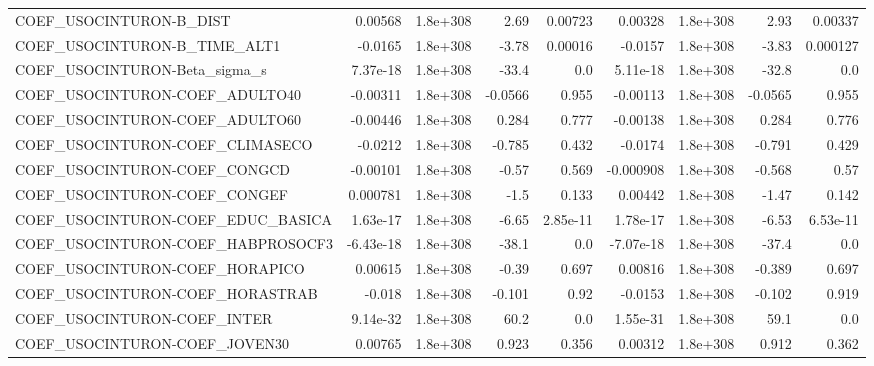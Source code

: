 \begin{tabular}{lrrrrrrrr}
COEF\_USOCINTURON-B\_DIST           &     0.00568 &     1.8e+308 &      2.69 &  0.00723 &    0.00328 &    1.8e+308 &         2.93 &       0.00337 \\
COEF\_USOCINTURON-B\_TIME\_ALT1      &     -0.0165 &     1.8e+308 &     -3.78 &  0.00016 &    -0.0157 &    1.8e+308 &        -3.83 &      0.000127 \\
COEF\_USOCINTURON-Beta\_sigma\_s     &    7.37e-18 &     1.8e+308 &     -33.4 &      0.0 &   5.11e-18 &    1.8e+308 &        -32.8 &           0.0 \\
COEF\_USOCINTURON-COEF\_ADULTO40    &    -0.00311 &     1.8e+308 &   -0.0566 &    0.955 &   -0.00113 &    1.8e+308 &      -0.0565 &         0.955 \\
COEF\_USOCINTURON-COEF\_ADULTO60    &    -0.00446 &     1.8e+308 &     0.284 &    0.777 &   -0.00138 &    1.8e+308 &        0.284 &         0.776 \\
COEF\_USOCINTURON-COEF\_CLIMASECO   &     -0.0212 &     1.8e+308 &    -0.785 &    0.432 &    -0.0174 &    1.8e+308 &       -0.791 &         0.429 \\
COEF\_USOCINTURON-COEF\_CONGCD      &    -0.00101 &     1.8e+308 &     -0.57 &    0.569 &  -0.000908 &    1.8e+308 &       -0.568 &          0.57 \\
COEF\_USOCINTURON-COEF\_CONGEF      &    0.000781 &     1.8e+308 &      -1.5 &    0.133 &    0.00442 &    1.8e+308 &        -1.47 &         0.142 \\
COEF\_USOCINTURON-COEF\_EDUC\_BASICA &    1.63e-17 &     1.8e+308 &     -6.65 & 2.85e-11 &   1.78e-17 &    1.8e+308 &        -6.53 &      6.53e-11 \\
COEF\_USOCINTURON-COEF\_HABPROSOCF3 &   -6.43e-18 &     1.8e+308 &     -38.1 &      0.0 &  -7.07e-18 &    1.8e+308 &        -37.4 &           0.0 \\
COEF\_USOCINTURON-COEF\_HORAPICO    &     0.00615 &     1.8e+308 &     -0.39 &    0.697 &    0.00816 &    1.8e+308 &       -0.389 &         0.697 \\
COEF\_USOCINTURON-COEF\_HORASTRAB   &      -0.018 &     1.8e+308 &    -0.101 &     0.92 &    -0.0153 &    1.8e+308 &       -0.102 &         0.919 \\
COEF\_USOCINTURON-COEF\_INTER       &    9.14e-32 &     1.8e+308 &      60.2 &      0.0 &   1.55e-31 &    1.8e+308 &         59.1 &           0.0 \\
COEF\_USOCINTURON-COEF\_JOVEN30     &     0.00765 &     1.8e+308 &     0.923 &    0.356 &    0.00312 &    1.8e+308 &        0.912 &         0.362 \\

\end{tabular}
